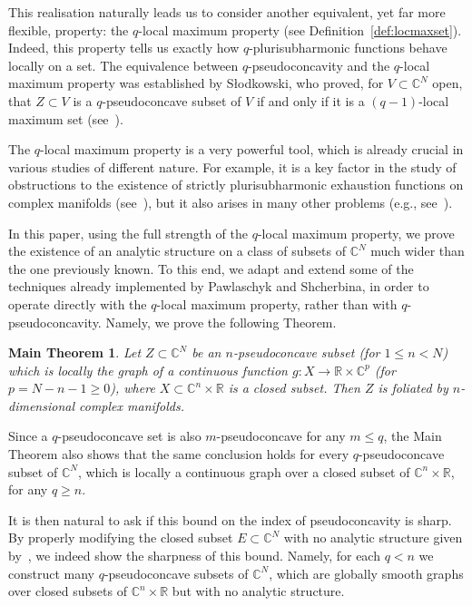 \documentclass[reqno,oneside]{amsart}
\newcommand{\numberset}{\mathbb}
\newcommand{\R}{\numberset{R}}
\newcommand{\C}{\numberset{C}}
\theoremstyle{definition}
\theoremstyle{plain}
\newtheorem*{mainthm}{Main Theorem}
\theoremstyle{remark}
\begin{document}
This realisation naturally leads us to consider another equivalent, yet far more flexible, property: the $q$-local maximum property (see Definition~\ref{def:locmaxset}). Indeed, this property tells us exactly how $q$-plurisubharmonic functions behave locally on a set. The equivalence between $q$-pseudoconcavity and the $q$-local maximum property was established by Słodkowski, who proved, for $V\subset\C^N$ open, that $Z\subset V$ is a $q$-pseudoconcave subset of $V$ if and only if it is a $(q-1)$-local maximum set (see~\cite[Theorem~4.2]{slodkowski:loc_max_property}).

The $q$-local maximum property is a very powerful tool, which is already crucial in various studies of different nature. For example, it is a key factor in the study of obstructions to the existence of strictly plurisubharmonic exhaustion functions on complex manifolds (see~\cite{mon_slod_tom:weaklycomplete,mon_tom:compact,slod_tom:minimal_kernels}), but it also arises in many other problems (e.g., see~\cite{pol_shch:separable,slodkowski:decomposition}).

In this paper, using the full strength of the $q$-local maximum property, we prove the existence of an analytic structure on a class of subsets of $\C^N$ much wider than the one previously known. To this end, we adapt and extend some of the techniques already implemented by Pawlaschyk and Shcherbina, in order to operate directly with the $q$-local maximum property, rather than with $q$-pseudoconcavity. Namely, we prove the following Theorem.
\begin{mainthm}
	Let $Z\subset\C^N$ be an $n$-pseudoconcave subset (for $1\leq n<N$) which is locally the graph of a continuous function $g:X\to\R\times\C^p$ (for $p=N-n-1\geq 0$), where $X\subset\C^n\times\R$ is a closed subset. Then $Z$ is foliated by $n$-dimensional complex manifolds.
\end{mainthm}
Since a $q$-pseudoconcave set is also $m$-pseudoconcave for any $m\leq q$, the Main Theorem also shows that the same conclusion holds for every $q$-pseudoconcave subset of $\C^N$, which is locally a continuous graph over a closed subset of $\C^n\times\R$, for any $q\geq n$.

It is then natural to ask if this bound on the index of pseudoconcavity is sharp. By properly modifying the closed subset $E\subset\C^N$ with no analytic structure given by~\cite[Theorem~1.1]{har_shch_tom:wermer}, we indeed show the sharpness of this bound. Namely, for each $q<n$ we construct many $q$-pseudoconcave subsets of $\C^N$, which are globally smooth graphs over closed subsets of $\C^n\times\R$ but with no analytic structure.
\end{document}
